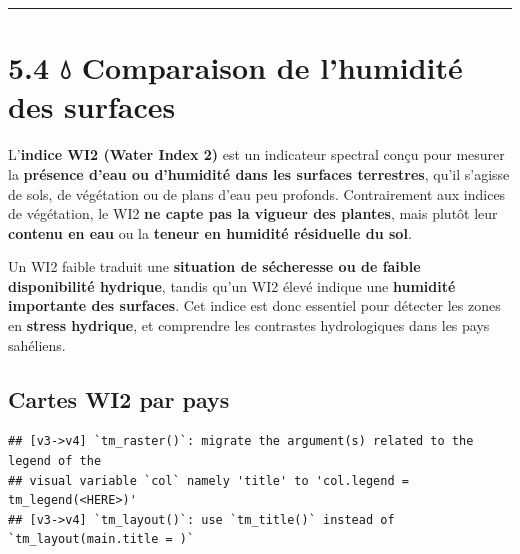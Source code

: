 \documentclass[
]{book}
\begin{document}
\begin{center}\rule{0.5\linewidth}{0.5pt}\end{center}

\section{5.4 💧 Comparaison de l'humidité des surfaces}\label{comparaison-de-lhumidituxe9-des-surfaces}

L'\textbf{indice WI2 (Water Index 2)} est un indicateur spectral conçu pour mesurer la \textbf{présence d'eau ou d'humidité dans les surfaces terrestres}, qu'il s'agisse de sols, de végétation ou de plans d'eau peu profonds. Contrairement aux indices de végétation, le WI2 \textbf{ne capte pas la vigueur des plantes}, mais plutôt leur \textbf{contenu en eau} ou la \textbf{teneur en humidité résiduelle du sol}.

Un WI2 faible traduit une \textbf{situation de sécheresse ou de faible disponibilité hydrique}, tandis qu'un WI2 élevé indique une \textbf{humidité importante des surfaces}. Cet indice est donc essentiel pour détecter les zones en \textbf{stress hydrique}, et comprendre les contrastes hydrologiques dans les pays sahéliens.

\subsection{Cartes WI2 par pays}\label{cartes-wi2-par-pays}

\begin{verbatim}
## [v3->v4] `tm_raster()`: migrate the argument(s) related to the legend of the
## visual variable `col` namely 'title' to 'col.legend = tm_legend(<HERE>)'
## [v3->v4] `tm_layout()`: use `tm_title()` instead of `tm_layout(main.title = )`
\end{verbatim}
\end{document}
